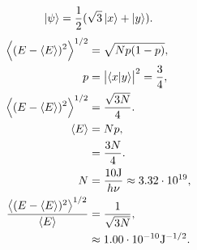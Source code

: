 \documentclass[a4paper,12pt,twoside]{article}
\begin{document}
\subsection{}%
\begin{equation}
	\ket{\psi} = \frac{1}{2} (\sqrt{3} \ket{x} + \ket{y}).
\end{equation}
\begin{align}
	\ev{(E-\ev{E})^2}^{1/2} &= \sqrt{Np(1-p)},\\
	p &= \abs{\ip{x}{y}}^2 = \frac{3}{4},\\
	\ev{(E-\ev{E})^2}^{1/2} &= \frac{\sqrt{3N}}{4}.\\
	\ev{E} &= Np,\\
	&= \frac{3N}{4}.\\
	N &= \frac{10\mathrm{J}}{h\nu} \approx 3.32 \cdot 10^{19},\\
	\frac{\ev{(E-\ev{E})^2}^{1/2}}{\ev{E}} &= \frac{1}{\sqrt{3N}},\\
	&\approx 1.00 \cdot 10^{-10}\mathrm{J^{-1/2}}.
\end{align}



\end{document}

